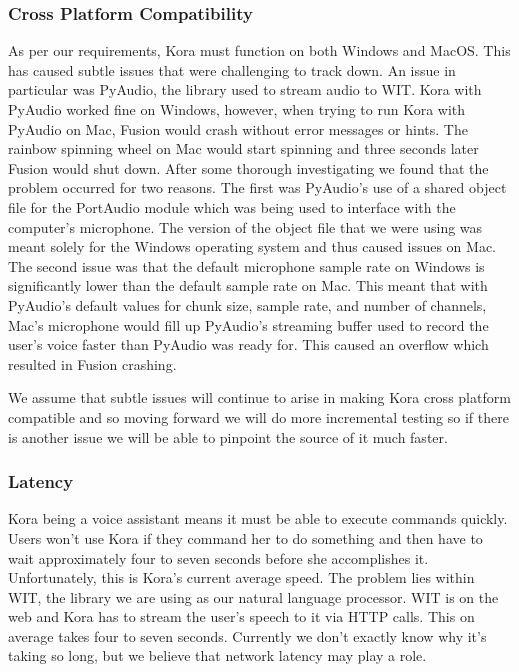 \documentclass[onecolumn, draftclsnofoot,10pt, compsoc]{IEEEtran}
\begin{document}
	    \subsubsection{Cross Platform Compatibility}
		    As per our requirements, Kora must function on both Windows and MacOS.
		    This has caused subtle issues that were challenging to track down.
		    An issue in particular was PyAudio, the library used to stream audio to WIT.
		    Kora with PyAudio worked fine on Windows, however, when trying to run Kora with PyAudio on Mac, Fusion would crash without error messages or hints.
		    The rainbow spinning wheel on Mac would start spinning and three seconds later Fusion would shut down.
		    After some thorough investigating we found that the problem occurred for two reasons.
		    The first was PyAudio's use of a shared object file for the PortAudio module which was being used to interface with the computer's microphone.
		    The version of the object file that we were using was meant solely for the Windows operating system and thus caused issues on Mac.
		   	The second issue was that the default microphone sample rate on Windows is significantly lower than the default sample rate on Mac.
		   	This meant that with PyAudio's default values for chunk size, sample rate, and number of channels, Mac's microphone would fill up PyAudio's streaming buffer used to record the user's voice faster than PyAudio was ready for.
		    This caused an overflow which resulted in Fusion crashing.
		    
		    We assume that subtle issues will continue to arise in making Kora cross platform compatible and so moving forward we will do more incremental testing so if there is another issue we will be able to pinpoint the source of it much faster. 
	    
	    \subsubsection{Latency}
		    Kora being a voice assistant means it must be able to execute commands quickly.
		    Users won't use Kora if they command her to do something and then have to wait approximately four to seven  seconds before she accomplishes it.
		    Unfortunately, this is Kora's current average speed.
		    The problem lies within WIT, the library we are using as our natural language processor.
		    WIT is on the web and Kora has to stream the user's speech to it via HTTP calls.
		    This on average takes four to seven seconds.
		    Currently we don't exactly know why it's taking so long, but we believe that network latency may play a role.
		    
\end{document}
